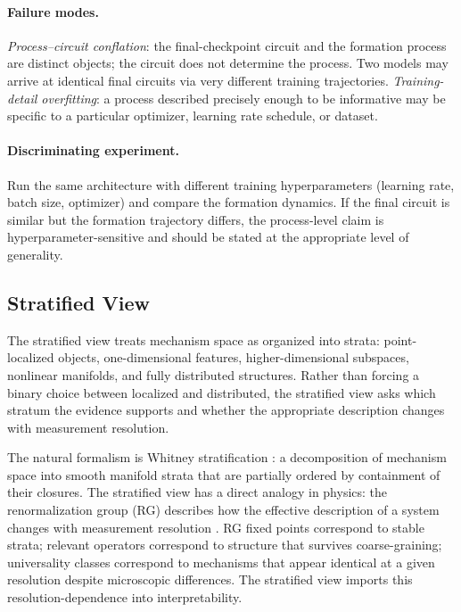 \documentclass{article}
\begin{document}
\paragraph{Failure modes.}
\emph{Process--circuit conflation}: the final-checkpoint circuit and the
formation process are distinct objects; the circuit does not determine
the process.  Two models may arrive at identical final circuits via very
different training trajectories.  \emph{Training-detail overfitting}: a
process described precisely enough to be informative may be specific to
a particular optimizer, learning rate schedule, or dataset.

\paragraph{Discriminating experiment.}
Run the same architecture with different training hyperparameters (learning
rate, batch size, optimizer) and compare the formation dynamics.  If the
final circuit is similar but the formation trajectory differs, the
process-level claim is hyperparameter-sensitive and should be stated at
the appropriate level of generality.

\subsection{Stratified View}

The stratified view treats mechanism space as organized into strata:
point-localized objects, one-dimensional features, higher-dimensional
subspaces, nonlinear manifolds, and fully distributed structures.  Rather
than forcing a binary choice between localized and distributed, the
stratified view asks which stratum the evidence supports and whether the
appropriate description changes with measurement resolution.


The natural formalism is Whitney stratification \citep{whitney1965,golubitsky1973}:
a decomposition of mechanism space into smooth manifold strata that are
partially ordered by containment of their closures.  The stratified view
has a direct analogy in physics: the renormalization group (RG) describes
how the effective description of a system changes with measurement
resolution \citep{wilson1971,goldenfeld1992}.  RG fixed points correspond
to stable strata; relevant operators correspond to structure that survives
coarse-graining; universality classes correspond to mechanisms that appear
identical at a given resolution despite microscopic differences.  The
stratified view imports this resolution-dependence into interpretability.
\end{document}
